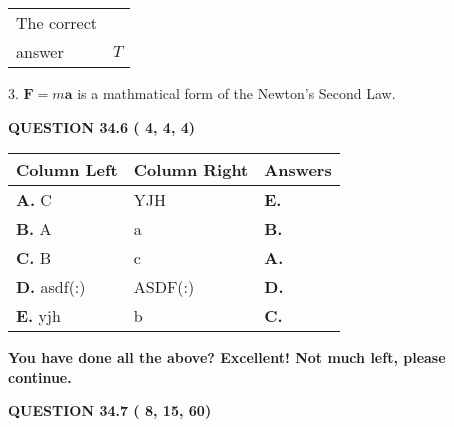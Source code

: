 \documentclass[12pt]{article}
\begin{document}
\noindent\begin{tabular}{|l|l|}\hline The correct & \\
          answer &  %
$T$ \\ \hline \end{tabular}
3.  %
$\mathbf{F}=m\mathbf{a}$ is a mathmatical form of  %
the Newton's Second Law.
 
 
 
  
\vspace{0.2in}
  
{\textbf{\Large{QUESTION
34.6 
 (          4,          4,          4)
}}}
  
  
 
 
\noindent{}
  
  
\begin{tabular}{|l|l|l|}
 \hline
 Column Left & Column Right  & Answers       \\ 
 \hline
{\textbf{\large{
A.}}}
C
  & 
YJH
 & 
{\textbf{\large{
E.}}}
 \\ 
 \hline
{\textbf{\large{
B.}}}
A
  & 
a
 & 
{\textbf{\large{
B.}}}
 \\ 
 \hline
{\textbf{\large{
C.}}}
B
  & 
c
 & 
{\textbf{\large{
A.}}}
 \\ 
 \hline
{\textbf{\large{
D.}}}
asdf(:)
  & 
ASDF(:)
 & 
{\textbf{\large{
D.}}}
 \\ 
 \hline
{\textbf{\large{
E.}}}
yjh
  & 
b
 & 
{\textbf{\large{
C.}}}
 \\ 
 \hline
 \end{tabular}
  
  
 
 
 
 
   
   
\vspace{0.3in}
{\textbf{\LARGE{You have done all the above? Excellent! Not much left, please continue.}}}
\vspace{0.3in}
   
   
  
\vspace{0.2in}
  
{\textbf{\Large{QUESTION
34.7 
 (          8,         15,         60)
}}}
  
  
 
 
\noindent{}
\end{document}
